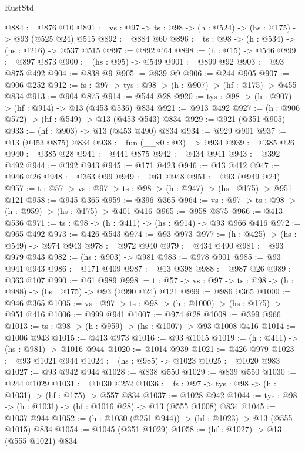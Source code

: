 \begin{lexlean}{RustStd}
\begin{coremodule}
@884 := @876 @10
@891 := {vs : @97} -> {ts : @98} -> (h : @524) -> (hs : @175) -> @93 (@525 @24) @515
@892 := @884 @60
@896 := {ts : @98} -> (h : @534) -> (hs : @216) -> @537 @515
@897 := @892 @64
@898 := (h : @15) -> @546
@899 := @897 @873
@900 := (hs : @95) -> @549
@901 := @899 @92
@903 := @93 @875 @492
@904 := @838 @9
@905 := @839 @9
@906 := @244 @905
@907 := @906 @252
@912 := {fs : @97} -> {tys : @98} -> (h : @907) -> (hf : @175) -> @455 @834
@913 := @904 @875
@914 := @544 @28
@920 := {tys : @98} -> (h : @907) -> (hf : @914) -> @13 (@453 @536) @834
@921 := @913 @492
@927 := (h : @906 @572) -> (hf : @549) -> @13 (@453 @543) @834
@929 := @921 (@351 @905)
@933 := (hf : @903) -> @13 (@453 @490) @834
@934 := @929 @901
@937 := @13 (@453 @875) @834
@938 := fun (__x0 : @3) => @934
@939 := @385 @26
@940 := @385 @28
@941 := @441 @875
@942 := @434 @941
@943 := @392 @492
@944 := @392 @943
@945 := @171 @423
@946 := @13 @412
@947 := @946 @26
@948 := @363 @99
@949 := @61 @948
@951 := @93 (@949 @24)
@957 := {t : @57} -> {vs : @97} -> {ts : @98} -> (h : @947) -> (hs : @175) -> @951 @121
@958 := @945 @365
@959 := @396 @365
@964 := {vs : @97} -> {ts : @98} -> (h : @959) -> (hs : @175) -> @401 @416
@965 := @958 @875
@966 := @413 @536
@971 := {ts : @98} -> (h : @411) -> (hs : @914) -> @93 @966 @416
@972 := @965 @492
@973 := @426 @543
@974 := @93 @973
@977 := (h : @425) -> (hs : @549) -> @974 @943
@978 := @972 @940
@979 := @434 @490
@981 := @93 @979 @943
@982 := (hs : @903) -> @981
@983 := @978 @901
@985 := @93 @941 @943
@986 := @171 @409
@987 := @13 @398
@988 := @987 @26
@989 := @363 @107
@990 := @61 @989
@998 := {t : @57} -> {vs : @97} -> {ts : @98} -> (h : @988) -> (hs : @175) -> @93 (@990 @24) @121
@999 := @986 @365
@1000 := @946 @365
@1005 := {vs : @97} -> {ts : @98} -> (h : @1000) -> (hs : @175) -> @951 @416
@1006 := @999 @941
@1007 := @974 @28
@1008 := @399 @966
@1013 := {ts : @98} -> (h : @959) -> (hs : @1007) -> @93 @1008 @416
@1014 := @1006 @943
@1015 := @413 @973
@1016 := @93 @1015
@1019 := (h : @411) -> (hs : @981) -> @1016 @944
@1020 := @1014 @939
@1021 := @426 @979
@1023 := @93 @1021 @944
@1024 := (hs : @985) -> @1023
@1025 := @1020 @983
@1027 := @93 @942 @944
@1028 := @838 @550
@1029 := @839 @550
@1030 := @244 @1029
@1031 := @1030 @252
@1036 := {fs : @97} -> {tys : @98} -> (h : @1031) -> (hf : @175) -> @557 @834
@1037 := @1028 @942
@1044 := {tys : @98} -> (h : @1031) -> (hf : @1016 @28) -> @13 (@555 @1008) @834
@1045 := @1037 @944
@1052 := (h : @1030 (@251 @944)) -> (hf : @1023) -> @13 (@555 @1015) @834
@1054 := @1045 (@351 @1029)
@1058 := (hf : @1027) -> @13 (@555 @1021) @834

\end{coremodule}
\end{lexlean}
